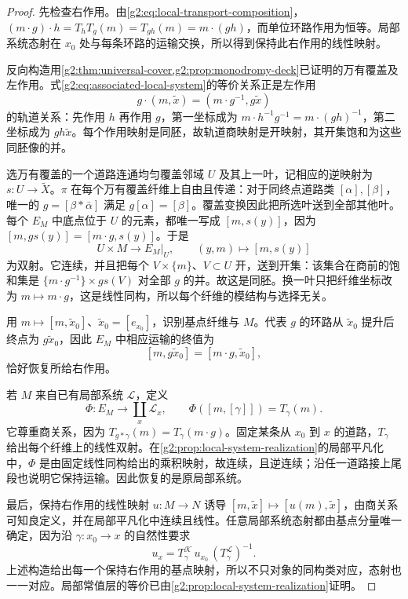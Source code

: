 \begin{proof}
	先检查右作用。由\eqref{g2:eq:local-transport-composition}，\((m\cdot g)\cdot h=T_hT_g(m)=T_{gh}(m)=m\cdot(gh)\)，而单位环路作用为恒等。局部系统态射在 \(x_0\) 处与每条环路的运输交换，所以得到保持此右作用的线性映射。

	反向构造用\cref{g2:thm:universal-cover,g2:prop:monodromy-deck}已证明的万有覆盖及左作用。式\eqref{g2:eq:associated-local-system}的等价关系正是左作用
	\[
		g\cdot(m,\widetilde x)=(m\cdot g^{-1},g\widetilde x)
	\]
	的轨道关系：先作用 \(h\) 再作用 \(g\)，第一坐标成为 \(m\cdot h^{-1}g^{-1}=m\cdot(gh)^{-1}\)，第二坐标成为 \(gh\widetilde x\)。每个作用映射是同胚，故轨道商映射是开映射，其开集饱和为这些同胚像的并。

	选万有覆盖的一个道路连通均匀覆盖邻域 \(U\) 及其上一叶，记相应的逆映射为 \(s:U\to\widetilde X\)。\(\pi\) 在每个万有覆盖纤维上自由且传递：对于同终点道路类 \([\alpha],[\beta]\)，唯一的 \(g=[\beta*\bar\alpha]\) 满足 \(g[\alpha]=[\beta]\)。覆盖变换因此把所选叶送到全部其他叶。每个 \(E_M\) 中底点位于 \(U\) 的元素，都唯一写成 \([m,s(y)]\)，因为 \([m,gs(y)]=[m\cdot g,s(y)]\)。于是
	\[
		U\times M\longrightarrow E_M|_U,\qquad(y,m)\longmapsto[m,s(y)]
	\]
	为双射。它连续，并且把每个 \(V\times\{m\}\)、\(V\subset U\) 开，送到开集：该集合在商前的饱和集是 \(\{m\cdot g^{-1}\}\times gs(V)\) 对全部 \(g\) 的并。故这是同胚。换一叶只把纤维坐标改为 \(m\mapsto m\cdot g\)，这是线性同构，所以每个纤维的模结构与选择无关。

	用 \(m\mapsto[m,\widetilde x_0]\)、\(\widetilde x_0=[e_{x_0}]\)，识别基点纤维与 \(M\)。代表 \(g\) 的环路从 \(\widetilde x_0\) 提升后终点为 \(g\widetilde x_0\)，因此 \(E_M\) 中相应运输的终值为
	\[
		[m,g\widetilde x_0]=[m\cdot g,\widetilde x_0],
	\]
	恰好恢复所给右作用。

	若 \(M\) 来自已有局部系统 \(\mathcal L\)，定义
	\[
		\Phi:E_M\longrightarrow\coprod_x\mathcal L_x,\qquad
		\Phi([m,[\gamma]])=T_\gamma(m).
	\]
	它尊重商关系，因为 \(T_{g*\gamma}(m)=T_\gamma(m\cdot g)\)。固定某条从 \(x_0\) 到 \(x\) 的道路，\(T_\gamma\) 给出每个纤维上的线性双射。在\cref{g2:prop:local-system-realization}的局部平凡化中，\(\Phi\) 是由固定线性同构给出的乘积映射，故连续，且逆连续；沿任一道路接上尾段也说明它保持运输。因此恢复的是原局部系统。

	最后，保持右作用的线性映射 \(u:M\to N\) 诱导 \([m,\widetilde x]\mapsto[u(m),\widetilde x]\)，由商关系可知良定义，并在局部平凡化中连续且线性。任意局部系统态射都由基点分量唯一确定，因为沿 \(\gamma:x_0\to x\) 的自然性要求
	\[
		u_x=T^{\mathcal K}_\gamma\,u_{x_0}\,(T^{\mathcal L}_\gamma)^{-1}.
	\]
	上述构造给出每一个保持右作用的基点映射，所以不只对象的同构类对应，态射也一一对应。局部常值层的等价已由\cref{g2:prop:local-system-realization}证明。
\end{proof}

